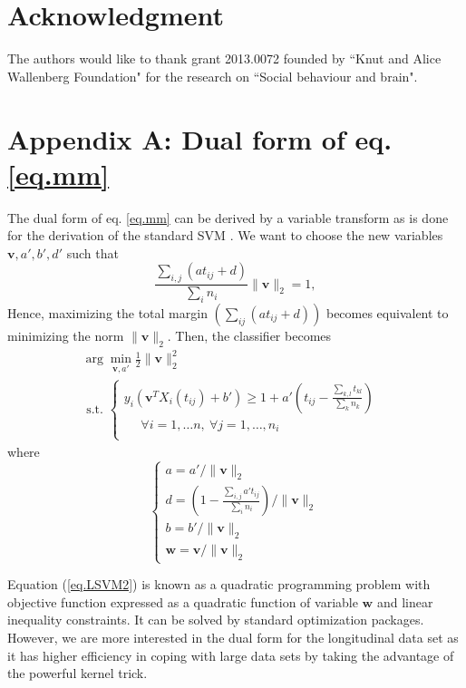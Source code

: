 \documentclass[12pt,a4paper]{article}%
\newcommand{\wv}{\mathbf{w}}
\newcommand{\vv}{\mathbf{v}}
\begin{document}
\section*{Acknowledgment}
The authors would like to thank grant 2013.0072 founded by ``Knut and Alice Wallenberg Foundation" for the research on ``Social behaviour and brain".





\section*{Appendix A: Dual form of eq. \ref{eq.mm}}
The dual form of eq. \ref{eq.mm} can be derived by a variable transform as is done for the derivation of the standard SVM \cite{cortes1995support}.
We want to choose the new variables $\vv, a', b', d' $ such that
\begin{equation}
\frac{ \sum_{i,j}(at_{ij}+d)}{\sum_i n_i} \|\vv\|_2 = 1,
\end{equation}
Hence, maximizing the total margin $\left(\sum_{ij}(at_{ij} + d) \right)$ becomes equivalent to minimizing the norm $\|\vv\|_2$.
Then, the classifier becomes
\begin{multline}
	 \arg\min_{\vv, a'}  \frac{1}{2}\|\vv\|_2^2
	\\
	\mbox{ \ s.t. \ }
	\begin{cases}
		y_i(\vv^TX_i(t_{ij}) + b') \geq 1+a' \left(t_{ij} - \frac{\sum_{k,l}t_{kl}}{\sum_k n_k} \right)& \\
		\ \ \ \ \ \  \forall i=1, \dots n, \ \forall j=1, \dots, n_i \\
	\end{cases}
	\label{eq.LSVM2}
\end{multline}
where
\begin{equation}
	\begin{cases}
		a = a' / \| \vv \|_2 \\
		d = \left(1-\frac{\sum_{i,j}a't_{ij} } {\sum_i n_i} \right)/ \|\vv\|_2\\
		b = b'/\| \vv \|_2 \\
		\wv = \vv / \|\vv\|_2
	\end{cases}
\end{equation}

Equation (\ref{eq.LSVM2}) is known as a quadratic programming problem with objective function expressed as a quadratic function of variable $\wv$ and linear inequality constraints. It can be solved by standard optimization packages. However, we are more interested in the dual form for the longitudinal data set as it has higher efficiency in coping with large data sets by taking the advantage of the powerful kernel trick.
\end{document}
